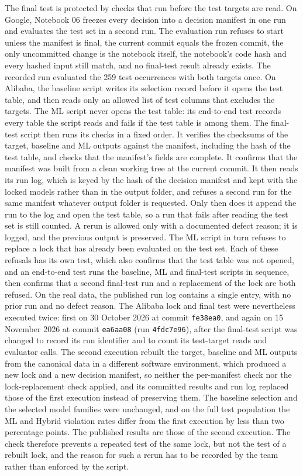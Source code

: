 The final test is protected by checks that run before the test targets are read. On Google, Notebook 06 freezes every decision into a decision manifest in one run and evaluates the test set in a second run. The evaluation run refuses to start unless the manifest is final, the current commit equals the frozen commit, the only uncommitted change is the notebook itself, the notebook's code hash and every hashed input still match, and no final-test result already exists. The recorded run evaluated the 259 test occurrences with both targets once. On Alibaba, the baseline script writes its selection record before it opens the test table, and then reads only an allowed list of test columns that excludes the targets. The ML script never opens the test table: its end-to-end test records every table the script reads and fails if the test table is among them. The final-test script then runs its checks in a fixed order. It verifies the checksums of the target, baseline and ML outputs against the manifest, including the hash of the test table, and checks that the manifest's fields are complete. It confirms that the manifest was built from a clean working tree at the current commit. It then reads its run log, which is keyed by the hash of the decision manifest and kept with the locked models rather than in the output folder, and refuses a second run for the same manifest whatever output folder is requested. Only then does it append the run to the log and open the test table, so a run that fails after reading the test set is still counted. A rerun is allowed only with a documented defect reason; it is logged, and the previous output is preserved. The ML script in turn refuses to replace a lock that has already been evaluated on the test set. Each of these refusals has its own test, which also confirms that the test table was not opened, and an end-to-end test runs the baseline, ML and final-test scripts in sequence, then confirms that a second final-test run and a replacement of the lock are both refused. On the real data, the published run log contains a single entry, with no prior run and no defect reason. The Alibaba lock and final test were nevertheless executed twice: first on 30 October 2026 at commit \texttt{fe38ea0}, and again on 15 November 2026 at commit \texttt{ea6aa08} (run \texttt{4fdc7e96}), after the final-test script was changed to record its run identifier and to count its test-target reads and evaluator calls. The second execution rebuilt the target, baseline and ML outputs from the canonical data in a different software environment, which produced a new lock and a new decision manifest, so neither the per-manifest check nor the lock-replacement check applied, and its committed results and run log replaced those of the first execution instead of preserving them. The baseline selection and the selected model families were unchanged, and on the full test population the ML and Hybrid violation rates differ from the first execution by less than two percentage points. The published results are those of the second execution. The check therefore prevents a repeated test of the same lock, but not the test of a rebuilt lock, and the reason for such a rerun has to be recorded by the team rather than enforced by the script.

